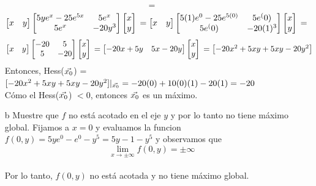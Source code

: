 \documentclass[a4paper,12pt]{article}
\begin{document}
\begin{itemize}
\[	=
	\]
	\[
	\begin{bmatrix}
	x & y
	\end{bmatrix}
	\begin{bmatrix}
	    5ye^x - 25e^{5x} & 5e^x\\
		5e^x & -20y^3\\
	\end{bmatrix}
	\begin{bmatrix}
	x \\ y
	\end{bmatrix}\\
	=
	\begin{bmatrix}
	x & y
	\end{bmatrix}
	\begin{bmatrix}
	    5(1)e^0 - 25e^{5(0)} & 5e^(0)\\
		5e^(0) & -20(1)^3\\
	\end{bmatrix}
	\begin{bmatrix}
	x \\ y
	\end{bmatrix}\\
	=
	\]
	\[
	\begin{bmatrix}
	x & y
	\end{bmatrix}
	\begin{bmatrix}
	    -20 & 5\\
		5 & -20\\
	\end{bmatrix}
	\begin{bmatrix}
	x \\ y
	\end{bmatrix}\\
	=
	\begin{bmatrix}
	-20x + 5y & 5x - 20y
	\end{bmatrix}
	\begin{bmatrix}
	x \\ y
	\end{bmatrix}\\
	=
	\begin{bmatrix}
	-20x^2+5xy+5xy-20y^2
	\end{bmatrix}
	\]
	Entonces, Hess($\vec{x_0}$) = $[-20x^2+5xy+5xy-20y^2]|_{\vec{x_0}} = -20(0)+10(0)(1)-20(1) = -20$\\
	Cómo el Hess($\vec{x_0}$) $< 0$, entonces $\vec{x_0}$ es un máximo.
	\item[b] Muestre que $f$ no está acotado en el eje $y$ y por lo tanto no tiene máximo global.
	Fijamos a $x = 0$ y evaluamos la funcion $f(0,y)= 5ye^0-e^0-y^5 = 5y-1-y^5$ y observamos que \[ \lim_{x \to \pm \infty} f(0,y) = \pm \infty \]\\
	Por lo tanto, $f(0,y)$ no está acotada y no tiene máximo global.

\end{itemize}
\end{document}
